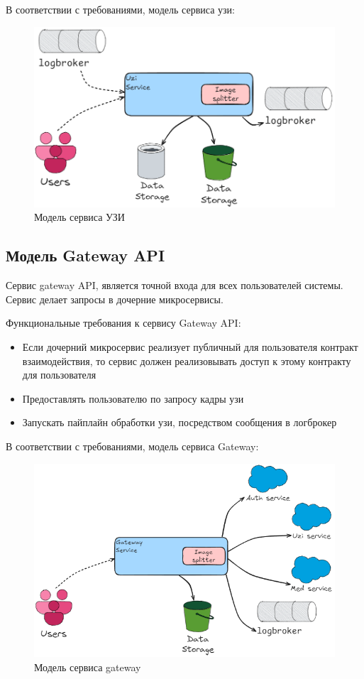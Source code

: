 В соответствии с требованиями, модель сервиса узи:
\begin{figure}[H]%
	\begin{center}
		\includegraphics[width=.5\columnwidth]{./img/uzi_model.png}%
	\end{center}
	\caption{Модель сервиса УЗИ}%
	\label{pic:auth_model}%
\end{figure}


\subsection{Модель Gateway API}
Сервис gateway API, является точной входа для всех пользователей системы. Сервис делает запросы в дочерние микросервисы.


Функциональные требования к сервису Gateway API:
\begin{itemize}
  \item Если дочерний микросервис реализует публичный для пользователя контракт взаимодействия, то сервис должен реализовывать доступ к этому контракту для пользователя
  \item Предоставлять пользователю по запросу кадры узи
  \item Запускать пайплайн обработки узи, посредством сообщения в логброкер
\end{itemize}


В соответствии с требованиями, модель сервиса Gateway:
\begin{figure}[H]%
	\begin{center}
		\includegraphics[width=.5\columnwidth]{./img/gateway_model.png}%
	\end{center}
	\caption{Модель сервиса gateway}%
	\label{pic:auth_model}%
\end{figure}

